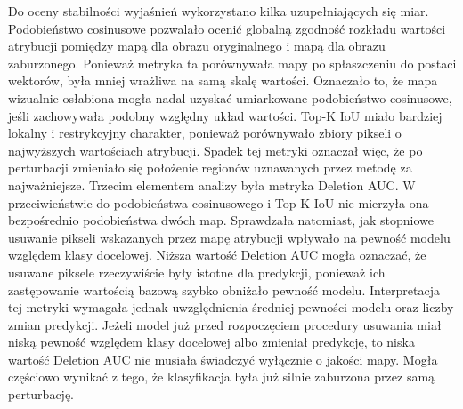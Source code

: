 Do oceny stabilności wyjaśnień wykorzystano kilka uzupełniających się miar. Podobieństwo cosinusowe pozwalało ocenić globalną zgodność rozkładu wartości atrybucji pomiędzy mapą dla obrazu oryginalnego i mapą dla obrazu zaburzonego. Ponieważ metryka ta porównywała mapy po spłaszczeniu do postaci wektorów, była mniej wrażliwa na samą skalę wartości. Oznaczało to, że mapa wizualnie osłabiona mogła nadal uzyskać umiarkowane podobieństwo cosinusowe, jeśli zachowywała podobny względny układ wartości. Top-K IoU miało bardziej lokalny i restrykcyjny charakter, ponieważ porównywało zbiory pikseli o najwyższych wartościach atrybucji. Spadek tej metryki oznaczał więc, że po perturbacji zmieniało się położenie regionów uznawanych przez metodę za najważniejsze. Trzecim elementem analizy była metryka Deletion AUC. W przeciwieństwie do podobieństwa cosinusowego i Top-K IoU nie mierzyła ona bezpośrednio podobieństwa dwóch map. Sprawdzała natomiast, jak stopniowe usuwanie pikseli wskazanych przez mapę atrybucji wpływało na pewność modelu względem klasy docelowej. Niższa wartość Deletion AUC mogła oznaczać, że usuwane piksele rzeczywiście były istotne dla predykcji, ponieważ ich zastępowanie wartością bazową szybko obniżało pewność modelu. Interpretacja tej metryki wymagała jednak uwzględnienia średniej pewności modelu oraz liczby zmian predykcji. Jeżeli model już przed rozpoczęciem procedury usuwania miał niską pewność względem klasy docelowej albo zmieniał predykcję, to niska wartość Deletion AUC nie musiała świadczyć wyłącznie o jakości mapy. Mogła częściowo wynikać z tego, że klasyfikacja była już silnie zaburzona przez samą perturbację.

